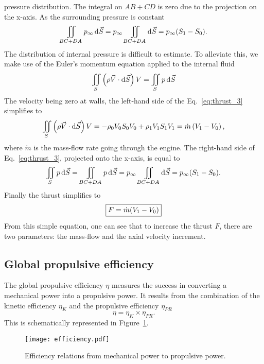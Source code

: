 pressure distribution. The integral on
$AB + CD$ is zero due to the projection on
the x-axis.
As the surrounding pressure is constant
\begin{equation}
	\iint_{BC + DA} p_{\infty} \diff \vec{S} =
	p_{\infty} \iint_{BC + DA} \diff \vec{S} =
	p_{\infty} (S_{1} - S_{0}).
	\label{eq:thrust_2}
\end{equation}
The distribution of internal pressure is
difficult to estimate. To alleviate this, 
we make use of the Euler’s momentum 
equation applied to the internal fluid
\begin{equation}
	\iint_{S} \left(\rho \vec{V} \cdot \diff \vec{S} \right) V = 
	\iint_{S} p \diff \vec{S}
	\label{eq:thrust_3}
\end{equation}
The velocity being zero at walls, 
the left-hand side of the Eq.~\eqref{eq:thrust_3}
simplifies to
\begin{equation}
	\iint_{S} \left(\rho \vec{V} \cdot \mathop{}\!\mathrm{d} \vec{S} \right) V =
	- \rho_0 V_0 S_0 V_0 +  \rho_1 V_1 S_1 V_1 = 
	\dot{m} \left( V_{1} - V_{0} \right),
\end{equation}
where $\dot{m}$ is the mass-flow rate going through the engine.
The right-hand side of Eq.~\eqref{eq:thrust_3}, projected onto
the x-axis, is equal to 
\begin{equation}
	\iint_{S} p \mathop{}\!\mathrm{d} \vec{S} = 
	\iint_{BC + DA} p \mathop{}\!\mathrm{d} \vec{S} = 
	p_{\infty} \iint_{BC + DA} \mathop{}\!\mathrm{d} \vec{S} =
	p_{\infty} (S_{1} - S_{0}).
\end{equation}
Finally the thrust simplifies to
\begin{equation}
	\fbox{$
	F = \dot{m} (V_{1} - V_{0})
	$}
	\label{eq:cror_thrust}
\end{equation}
From this simple equation,
one can see that to increase the thrust $F$, there are two parameters:
the mass-flow and the axial velocity increment.

\subsection{Global propulsive efficiency}
\label{sub:cror_efficiency}

The global propulsive efficiency $\eta$ measures the 
success in converting a mechanical power into a
propulsive power. It results from the combination
of the kinetic efficiency $\eta_{K}$ and the propulsive efficiency
$\eta_{PR}$
\begin{equation}
	\eta = \eta_{K} \times \eta_{PR}.
\end{equation}
This is schematically represented in Figure~\ref{fig:cror_efficiency}.
\begin{figure}[htp]
  \centering
  \texttt{[image: efficiency.pdf]}
  \caption{Efficiency relations from mechanical power to propulsive power.}
  \label{fig:cror_efficiency}
\end{figure}

